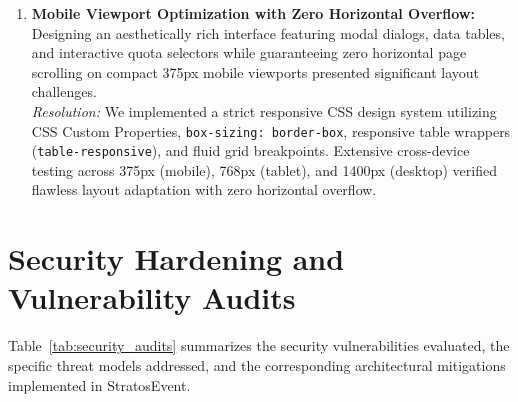 \documentclass[11pt,a4paper]{report}
\begin{document}
\begin{enumerate}[leftmargin=1.5em, itemsep=0.8em]
    \item \textbf{Mobile Viewport Optimization with Zero Horizontal Overflow:}
    Designing an aesthetically rich interface featuring modal dialogs, data tables, and interactive quota selectors while guaranteeing zero horizontal page scrolling on compact 375px mobile viewports presented significant layout challenges.
    \\\textit{Resolution:} We implemented a strict responsive CSS design system utilizing CSS Custom Properties, \texttt{box-sizing: border-box}, responsive table wrappers (\texttt{table-responsive}), and fluid grid breakpoints. Extensive cross-device testing across 375px (mobile), 768px (tablet), and 1400px (desktop) verified flawless layout adaptation with zero horizontal overflow.
\end{enumerate}

\section{Security Hardening and Vulnerability Audits}
\justifying
Table~\ref{tab:security_audits} summarizes the security vulnerabilities evaluated, the specific threat models addressed, and the corresponding architectural mitigations implemented in StratosEvent.
\end{document}
